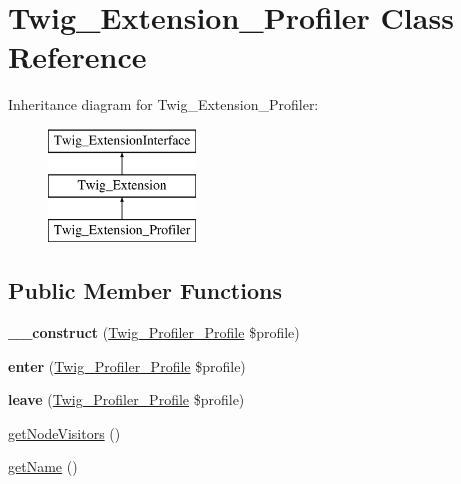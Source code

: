 \hypertarget{classTwig__Extension__Profiler}{}\section{Twig\+\_\+\+Extension\+\_\+\+Profiler Class Reference}
\label{classTwig__Extension__Profiler}
Inheritance diagram for Twig\+\_\+\+Extension\+\_\+\+Profiler\+:\begin{figure}[H]
\begin{center}
\leavevmode
\includegraphics[height=3.000000cm]{classTwig__Extension__Profiler}
\end{center}
\end{figure}
\subsection*{Public Member Functions}
\begin{DoxyCompactItemize}
\item 
{\bfseries \+\_\+\+\_\+construct} (\hyperlink{classTwig__Profiler__Profile}{Twig\+\_\+\+Profiler\+\_\+\+Profile} \$profile)\hypertarget{classTwig__Extension__Profiler_a38b3e1f958147419a50d1c4e513b7c3e}{}\label{classTwig__Extension__Profiler_a38b3e1f958147419a50d1c4e513b7c3e}

\item 
{\bfseries enter} (\hyperlink{classTwig__Profiler__Profile}{Twig\+\_\+\+Profiler\+\_\+\+Profile} \$profile)\hypertarget{classTwig__Extension__Profiler_ac94e08093747935d5138e11abee9214f}{}\label{classTwig__Extension__Profiler_ac94e08093747935d5138e11abee9214f}

\item 
{\bfseries leave} (\hyperlink{classTwig__Profiler__Profile}{Twig\+\_\+\+Profiler\+\_\+\+Profile} \$profile)\hypertarget{classTwig__Extension__Profiler_a59ce11cad952013e30df6839023e43ea}{}\label{classTwig__Extension__Profiler_a59ce11cad952013e30df6839023e43ea}

\item 
\hyperlink{classTwig__Extension__Profiler_a650d22ae92e96458e57b5ecbfc4e83b0}{get\+Node\+Visitors} ()
\item 
\hyperlink{classTwig__Extension__Profiler_a84fa2e69022d4b700228a94b68cd79de}{get\+Name} ()
\end{DoxyCompactItemize}


